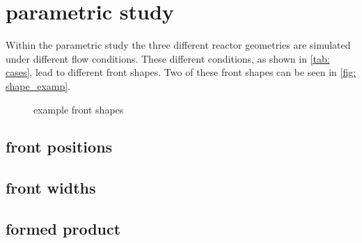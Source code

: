 \documentclass[../thesis.tex]{subfiles}
\begin{document}
\chapter{parametric study}
\label{chp: para_stud}
Within the parametric study the three different reactor geometries are simulated under different flow conditions. These different conditions, as shown in \autoref{tab: cases}, lead to different front shapes. Two of these front shapes can be seen in \autoref{fig: shape_examp}.

\begin{figure}[htb]
	\centering
	\qquad
	\caption{example front shapes}%
	\label{fig: shape_examp}%
\end{figure}

\section{front positions}

\section{front widths}

\section{formed product}
\end{document}
